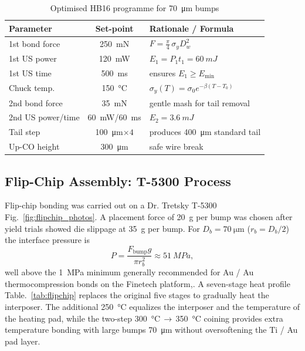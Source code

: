 \documentclass[conference]{IEEEtran}
\begin{document}
\begin{table}[htbp]
  \caption{Optimised HB16 programme for \SI{70}{\micro\metre} bumps}
  \label{tab:bump_param}
  \centering
  \begin{tabular}{|l|c|l|}
    \hline
    \textbf{Parameter} & \textbf{Set-point} & \textbf{Rationale / Formula}\\\hline
    1st bond force & \SI{250}{mN} &
    \(\displaystyle F =\frac{\pi}{4}\,\sigma_{y}D_w^{2}\)\\
    1st US power & \SI{120}{mW} &
    \(\displaystyle E_1 = P_1 t_1 = \SI{60}{mJ}\)\\
    1st US time  & \SI{500}{ms} & ensures \(E_1\ge E_{\min}\)\\
    Chuck temp.  & \SI{150}{\celsius} &
    \(\sigma_{y}(T)=\sigma_{0}e^{-\beta(T-T_0)}\)\\
    2nd bond force & \SI{35}{mN} & gentle mash for tail removal\\
    2nd US power/time & \SI{60}{mW}/\SI{60}{ms} &
    \(\displaystyle E_2 = \SI{3.6}{mJ}\)\\
    Tail step      & \SI{100}{\micro\metre}\(\times4\) &  
    produces \SI{400}{\micro\metre} standard tail\\
    Up-CO height   & \SI{300}{\micro\metre} & safe wire break\\\hline
  \end{tabular}
    \vspace{-10px}
\end{table}

\subsection{Flip-Chip Assembly: T-5300 Process}\label{subsec:flipchip}

Flip-chip bonding was carried out on a Dr. Tretsky T-5300 Fig.~\ref{fig:flipchip_photos}. A
placement force of \SI{20}{g} per bump was chosen after yield trials showed
die slippage at \SI{35}{g} per bump.  For \(D_b=\SI{70}{\micro\metre}\)
(\(r_b=D_b/2\)) the interface pressure is
%
\begin{equation}
P=\frac{F_\text{bump}g}{\pi r_b^{2}}\approx\SI{51}{MPa},
\label{eq:pressure}
\end{equation}
%
well above the \SI{1}{MPa} minimum generally recommended for Au / Au thermocompression bonds on the Finetech platform,\cite{Deng2016}.  A seven-stage heat
profile Table.~\ref{tab:flipchip} replaces the original five stages to
gradually heat the interposer. The additional
\SI{250}{\celsius} equalizes the interposer and the temperature of the heating pad, while
the two-step \SI{300}{\celsius}\,$\rightarrow$\,\SI{350}{\celsius}
coining provides extra temperature bonding with large bumps \SI{70}{\micro\metre} without oversoftening the Ti / Au pad layer.
\end{document}
